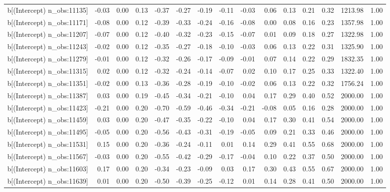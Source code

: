\begin{table}[ht]
\begin{tabular}{rrrrrrrrrrrrrrr}
  b[(Intercept) n\_obs:11135] & -0.03 & 0.00 & 0.13 & -0.37 & -0.27 & -0.19 & -0.11 & -0.03 & 0.06 & 0.13 & 0.21 & 0.32 & 1213.98 & 1.00 \\ 
  b[(Intercept) n\_obs:11171] & -0.08 & 0.00 & 0.12 & -0.39 & -0.33 & -0.24 & -0.16 & -0.08 & 0.00 & 0.08 & 0.16 & 0.23 & 1357.98 & 1.00 \\ 
  b[(Intercept) n\_obs:11207] & -0.07 & 0.00 & 0.12 & -0.40 & -0.32 & -0.23 & -0.15 & -0.07 & 0.01 & 0.09 & 0.18 & 0.27 & 1322.98 & 1.00 \\ 
  b[(Intercept) n\_obs:11243] & -0.02 & 0.00 & 0.12 & -0.35 & -0.27 & -0.18 & -0.10 & -0.03 & 0.06 & 0.13 & 0.22 & 0.31 & 1325.90 & 1.00 \\ 
  b[(Intercept) n\_obs:11279] & -0.01 & 0.00 & 0.12 & -0.32 & -0.26 & -0.17 & -0.09 & -0.01 & 0.07 & 0.14 & 0.22 & 0.29 & 1832.35 & 1.00 \\ 
  b[(Intercept) n\_obs:11315] & 0.02 & 0.00 & 0.12 & -0.32 & -0.24 & -0.14 & -0.07 & 0.02 & 0.10 & 0.17 & 0.25 & 0.33 & 1322.40 & 1.00 \\ 
  b[(Intercept) n\_obs:11351] & -0.02 & 0.00 & 0.13 & -0.36 & -0.28 & -0.19 & -0.10 & -0.02 & 0.06 & 0.13 & 0.22 & 0.32 & 1756.24 & 1.00 \\ 
  b[(Intercept) n\_obs:11387] & 0.03 & 0.00 & 0.19 & -0.45 & -0.34 & -0.21 & -0.10 & 0.04 & 0.17 & 0.29 & 0.40 & 0.52 & 2000.00 & 1.00 \\ 
  b[(Intercept) n\_obs:11423] & -0.21 & 0.00 & 0.20 & -0.70 & -0.59 & -0.46 & -0.34 & -0.21 & -0.08 & 0.05 & 0.16 & 0.28 & 2000.00 & 1.00 \\ 
  b[(Intercept) n\_obs:11459] & 0.03 & 0.00 & 0.20 & -0.47 & -0.35 & -0.22 & -0.10 & 0.04 & 0.17 & 0.30 & 0.41 & 0.54 & 2000.00 & 1.00 \\ 
  b[(Intercept) n\_obs:11495] & -0.05 & 0.00 & 0.20 & -0.56 & -0.43 & -0.31 & -0.19 & -0.05 & 0.09 & 0.21 & 0.33 & 0.46 & 2000.00 & 1.00 \\ 
  b[(Intercept) n\_obs:11531] & 0.15 & 0.00 & 0.20 & -0.36 & -0.24 & -0.11 & 0.01 & 0.14 & 0.29 & 0.41 & 0.55 & 0.68 & 2000.00 & 1.00 \\ 
  b[(Intercept) n\_obs:11567] & -0.03 & 0.00 & 0.20 & -0.55 & -0.42 & -0.29 & -0.17 & -0.04 & 0.10 & 0.22 & 0.37 & 0.50 & 2000.00 & 1.00 \\ 
  b[(Intercept) n\_obs:11603] & 0.17 & 0.00 & 0.20 & -0.34 & -0.23 & -0.09 & 0.03 & 0.17 & 0.30 & 0.43 & 0.55 & 0.67 & 2000.00 & 1.00 \\ 
  b[(Intercept) n\_obs:11639] & 0.01 & 0.00 & 0.20 & -0.50 & -0.39 & -0.25 & -0.12 & 0.01 & 0.14 & 0.28 & 0.41 & 0.50 & 2000.00 & 1.00 \\ 

\end{tabular}
\end{table}
